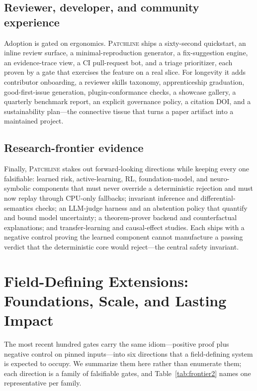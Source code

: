 \documentclass[11pt]{article}
\newcommand{\tool}{\textsc{Patchline}}
\begin{document}
\subsection{Reviewer, developer, and community experience}
Adoption is gated on ergonomics. \tool{} ships a sixty-second quickstart, an inline review surface,
a minimal-reproduction generator, a fix-suggestion engine, an evidence-trace view, a CI pull-request
bot, and a triage prioritizer, each proven by a gate that exercises the feature on a real slice.
For longevity it adds contributor onboarding, a reviewer skills taxonomy, apprenticeship graduation, good-first-issue generation, plugin-conformance
checks, a showcase gallery, a quarterly benchmark report, an explicit governance policy, a citation
DOI, and a sustainability plan---the connective tissue that turns a paper artifact into a maintained
project.

\subsection{Research-frontier evidence}
Finally, \tool{} stakes out forward-looking directions while keeping every one falsifiable: learned
risk, active-learning, RL, foundation-model, and neuro-symbolic components that must never override a
deterministic rejection and must now replay through CPU-only fallbacks; invariant inference and
differential-semantics checks; an LLM-judge harness and an abstention policy that quantify and bound
model uncertainty; a theorem-prover backend and counterfactual explanations; and transfer-learning and
causal-effect studies. Each ships with a negative control proving the learned component cannot
manufacture a passing verdict that the deterministic core would reject---the central safety invariant.

\section{Field-Defining Extensions: Foundations, Scale, and Lasting Impact}
\label{sec:frontier2}

The most recent hundred gates carry the same idiom---positive proof plus negative control on pinned
inputs---into six directions that a field-defining system is expected to occupy. We summarize them
here rather than enumerate them; each direction is a family of falsifiable gates, and
Table~\ref{tab:frontier2} names one representative per family.
\end{document}

